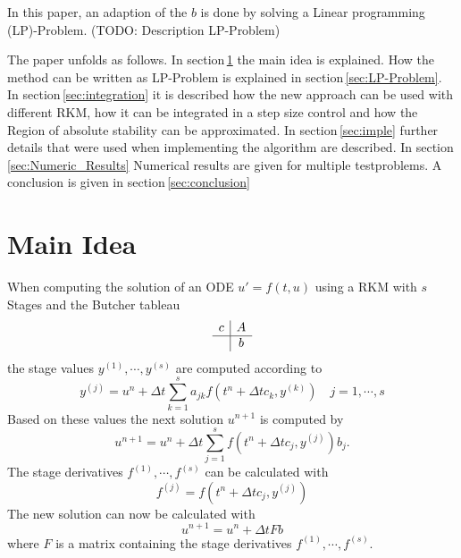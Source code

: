 \documentclass{article}
\begin{document}
In this paper, an adaption of the $b$ is done by solving a Linear programming (LP)-Problem.
(TODO: Description LP-Problem)

The paper unfolds as follows. In section\,\ref{sec:main_idea} the main idea is explained. How the method can be written as LP-Problem is explained in section\,\ref{sec:LP-Problem}.
In section\,\ref{sec:integration} it is described how the new approach can be used with different RKM, how it can be integrated in a step size control and how the Region of absolute stability can be approximated.  
In section\,\ref{sec:imple} further details that were used when implementing the algorithm are described.
In section\,\ref{sec:Numeric_Results} Numerical results are given for multiple testproblems.
A conclusion is given in section\,\ref{sec:conclusion}  



\section{Main Idea}\label{sec:main_idea}

When computing the solution of an ODE $u ' = f(t,u) $ using a RKM with $s$ Stages and the Butcher tableau
\begin{align}
\begin{array}{c|c}
c &  A \\
\hline
 & b\\
\end{array}
\end{align}
the stage values $y^{(1)},\cdots,y^{(s)}$ are computed according to
\begin{equation}
y^{(j)} =  u^n + \Delta t \sum_{k = 1}^{s} a_{jk} f(t^n + \Delta t c_k,y^{(k)})  \quad j = 1,\cdots,s
\end{equation}
Based on these values the next solution $u^{n+1}$ is computed by
\begin{equation}
u^{n+1} = u^n + \Delta t \sum_{j  = 1}^s f(t^n + \Delta t c_j,y^{(j)}) b_j .
\end{equation}
The stage derivatives $f^{(1)},\cdots,f^{(s)}$ can be calculated with
\begin{equation}
f^{(j)} = f(t^n + \Delta t c_j,y^{(j)})
\end{equation}
The new solution can now be calculated with
\begin{equation}\label{eq:Combination}
u^{n+1} = u^n + \Delta t F b
\end{equation}
where $F$ is a matrix containing the stage derivatives $f^{(1)},\cdots,f^{(s)}$.
\end{document}
